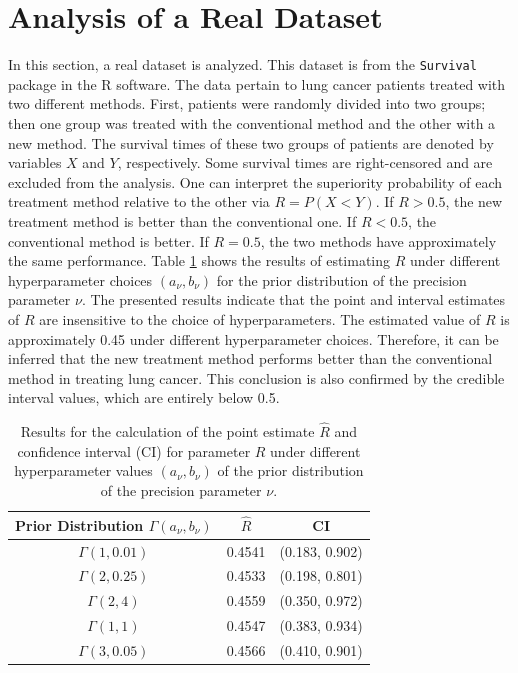 \documentclass[twoside]{article}
\begin{document}
\section{Analysis of a Real Dataset}
In this section, a real dataset is analyzed. This dataset is from the \texttt{Survival} package in the R software. The data pertain to lung cancer patients treated with two different methods. First, patients were randomly divided into two groups; then one group was treated with the conventional method and the other with a new method. The survival times of these two groups of patients are denoted by variables \(X\) and \(Y\), respectively. Some survival times are right-censored and are excluded from the analysis. One can interpret the superiority probability of each treatment method relative to the other via \(R = P(X < Y)\). If \(R > 0.5\), the new treatment method is better than the conventional one. If \(R < 0.5\), the conventional method is better. If \(R = 0.5\), the two methods have approximately the same performance. Table \ref{tab:5} shows the results of estimating \(R\) under different hyperparameter choices \((a_\nu, b_\nu)\) for the prior distribution of the precision parameter \(\nu\). The presented results indicate that the point and interval estimates of \(R\) are insensitive to the choice of hyperparameters. The estimated value of \(R\) is approximately 0.45 under different hyperparameter choices. Therefore, it can be inferred that the new treatment method performs better than the conventional method in treating lung cancer. This conclusion is also confirmed by the credible interval values, which are entirely below 0.5.

\begin{table}[htbp]
\centering
\small
\caption{Results for the calculation of the point estimate \(\hat{R}\) and confidence interval (CI) for parameter \(R\) under different hyperparameter values \((a_{\nu}, b_{\nu})\) of the prior distribution of the precision parameter \(\nu\).}
\label{tab:5}
\begin{tabular}{|ccc|}
\toprule
\hline
Prior Distribution \(\Gamma(a_{\nu}, b_{\nu})\) & \(\hat{R}\) & CI \\
\midrule
\hline
\(\Gamma(1, 0.01)\) & 0.4541 & (0.183, 0.902) \\
\(\Gamma(2, 0.25)\) & 0.4533 & (0.198, 0.801) \\
\(\Gamma(2, 4)\) & 0.4559 & (0.350, 0.972) \\
\(\Gamma(1, 1)\) & 0.4547 & (0.383, 0.934) \\
\(\Gamma(3, 0.05)\) & 0.4566 & (0.410, 0.901) \\
\bottomrule
\hline
\end{tabular}
\end{table}
\end{document}
